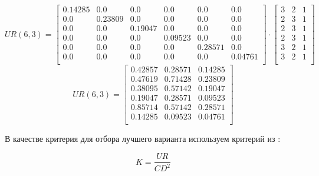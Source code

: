 $$
    UR(6,3) =
        \begin{bmatrix}
            0.14285 & 0.0     & 0.0     & 0.0     & 0.0     & 0.0     \\
            0.0     & 0.23809 & 0.0     & 0.0     & 0.0     & 0.0     \\
            0.0     & 0.0     & 0.19047 & 0.0     & 0.0     & 0.0     \\
            0.0     & 0.0     & 0.0     & 0.09523 & 0.0     & 0.0     \\
            0.0     & 0.0     & 0.0     & 0.0     & 0.28571 & 0.0     \\
            0.0     & 0.0     & 0.0     & 0.0     & 0.0     & 0.04761 \\
        \end{bmatrix}
        \cdot
        \begin{bmatrix}
            3 & 2 & 1 \\
            2 & 3 & 1 \\
            2 & 3 & 1 \\
            2 & 3 & 1 \\
            3 & 2 & 1 \\
            3 & 2 & 1 \\
        \end{bmatrix}
$$
\begin{equation}
        UR(6,3) =
        \begin{bmatrix}
            0.42857 & 0.28571 & 0.14285 \\
            0.47619 & 0.71428 & 0.23809 \\
            0.38095 & 0.57142 & 0.19047 \\
            0.19047 & 0.28571 & 0.09523 \\
            0.85714 & 0.57142 & 0.28571 \\
            0.14285 & 0.09523 & 0.04761 \\
        \end{bmatrix}
    \label{eq_cd_rez}
\end{equation}

В качестве критерия для отбора лучшего варианта используем
критерий из \cite[стр. 21]{econ_FSA}:

\begin{equation}
    K = \frac{UR}{CD^2}
    \label{eq_econ_best_var_form}
\end{equation}

